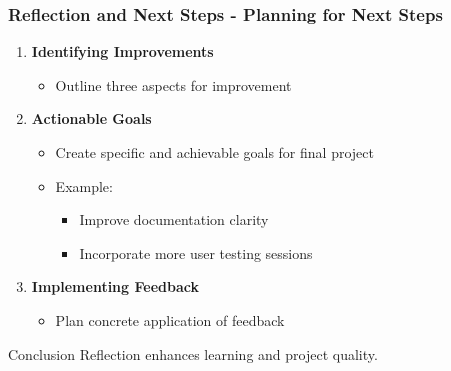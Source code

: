 \documentclass[aspectratio=169]{beamer}
\begin{document}
\begin{frame}[fragile]
    \frametitle{Reflection and Next Steps - Planning for Next Steps}
    \begin{enumerate}
        \item \textbf{Identifying Improvements}
            \begin{itemize}
                \item Outline three aspects for improvement
            \end{itemize}
        
        \item \textbf{Actionable Goals}
            \begin{itemize}
                \item Create specific and achievable goals for final project
                \item Example:
                    \begin{itemize}
                        \item Improve documentation clarity
                        \item Incorporate more user testing sessions
                    \end{itemize}
            \end{itemize}
        
        \item \textbf{Implementing Feedback}
            \begin{itemize}
                \item Plan concrete application of feedback
            \end{itemize}
    \end{enumerate}
    \begin{block}{Conclusion}
        Reflection enhances learning and project quality.
    \end{block}
\end{frame}
\end{document}
